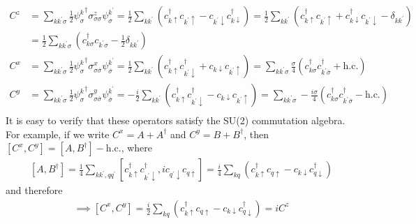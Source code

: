 \documentclass[twoside,11pt]{report}
\numberwithin{equation}{section}
\begin{document}
\begin{equation}\begin{aligned}
	C^z 
	&= \sum_{kk^\prime\sigma}\frac{1}{2} {\psi^k_\sigma}^\dagger \sigma^z_{\sigma\sigma} \psi^{k^\prime}_\sigma = \frac{1}{2}\sum_{kk^\prime}\left(c^\dagger_{k\uparrow}c_{k^\prime \uparrow} - c_{k^\prime\downarrow}c^\dagger_{k \downarrow}\right) = \frac{1}{2}\sum_{kk^\prime}\left(c^\dagger_{k\uparrow}c_{k^\prime \uparrow} + c^\dagger_{k\downarrow}c_{k^\prime \downarrow} - \delta_{kk^\prime}\right)\\
	&= \frac{1}{2}\sum_{kk^\prime\sigma}\left(c^\dagger_{k\sigma}c_{k^\prime \sigma} - \frac{1}{2}\delta_{kk^\prime}\right)\label{diagonalCz}\\
	C^x 
	&= \sum_{kk^\prime\sigma}\frac{1}{2} {\psi^k_\sigma}^\dagger \sigma^x_{\sigma\overline\sigma} \psi^{k^\prime}_{\overline\sigma} = \frac{1}{2}\sum_{kk^\prime}\left( c^\dagger_{k\uparrow}c^\dagger_{k^\prime \downarrow} + c_{k\downarrow}c_{k^\prime \uparrow} \right) = \sum_{kk^\prime\sigma} \frac{\sigma}{4}\left( c^\dagger_{k\sigma}c^\dagger_{k^\prime\overline\sigma} + \text{h.c.} \right) \\
	C^y 
	&= \sum_{kk^\prime\sigma}\frac{1}{2} {\psi^k_\sigma}^\dagger \sigma^y_{\sigma\overline\sigma} \psi^{k^\prime}_{\overline\sigma} = - \frac{i}{2}\sum_{kk^\prime}\left( c^\dagger_{k\uparrow}c^\dagger_{k^\prime \downarrow} - c_{k\downarrow}c_{k^\prime \uparrow} \right) = \sum_{kk^\prime\sigma} - \frac{i\sigma}{4}\left( c^\dagger_{k\sigma}c^\dagger_{k^\prime\overline\sigma} - \text{h.c.} \right)\\
\end{aligned}\end{equation}
It is easy to verify that these operators satisfy the SU(2) commutation algebra. For example, if we write \(C^x = A + A^\dagger\) and \(C^y = B + B^\dagger\), then \(\left[ C^x, C^y \right] = \left[ A, B^\dagger \right] - \text{h.c.}\), where
\begin{equation}\begin{aligned}
	\left[ A, B^\dagger \right] = \frac{1}{4}\sum_{kk^\prime,qq^\prime}\left[ c^\dagger_{k\uparrow}c^\dagger_{k^\prime \downarrow}, i c_{q^\prime \downarrow}c_{q \uparrow} \right] = \frac{i}{4}\sum_{kq}\left(c^\dagger_{k\uparrow}c_{q \uparrow} - c_{k \downarrow}c^\dagger_{q \downarrow}\right)
\end{aligned}\end{equation}
and therefore
\begin{equation}\begin{aligned}
	\implies \left[ C^x, C^y \right] = \frac{i}{2}\sum_{kq}\left(c^\dagger_{k\uparrow}c_{q \uparrow} - c_{k \downarrow}c^\dagger_{q \downarrow}\right) = i C^z
\end{aligned}\end{equation}
\end{document}

